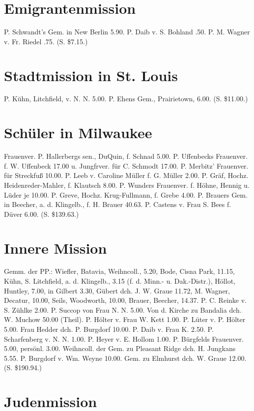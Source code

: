 \section{Emigrantenmission}

P. Schwandt’s Gem. in New Berlin 5.90. P. Daib v. S. Bohland .50. P. M. Wagner v. Fr. Riedel .75. (S. \$7.15.)

\section{Stadtmission in St. Louis}

P. Kühn, Litchfield, v. N. N. 5.00. P. Ehens Gem., Prairietown, 6.00. (S. \$11.00.)

\section{Schüler in Milwaukee}

Frauenver. P. Hallerbergs sen., DuQuin, f. Schnad 5.00. P. Uffenbecks Frauenver. f. W. Uffenbeck 17.00 u. Jungfrver. für C. Schmodt 17.00. P. Merbitz’ Frauenver. für Streckfuß 10.00. P. Leeb v. Caroline Müller f. G. Müller 2.00. P. Gräf, Hochz. Heidenreder-Mahler, f. Klautsch 8.00. P. Wunders Frauenver. f. Höhne, Hennig u. Lüder je 10.00. P. Greve, Hochz. Krug-Fullmann, f. Grebe 4.00. P. Brauers Gem. in Beecher, a. d. Klingelb., f. H. Brauer 40.63. P. Castens v. Frau S. Bees f. Düver 6.00. (S. \$139.63.)

\section{Innere Mission}

Gemm. der PP.: Wiefler, Batavia, Weihncoll., 5.20, Bode, Cisna Park, 11.15, Kühn, S. Litchfield, a. d. Klingelb., 3.15 (f. d. Minn.- u. Dak.-Distr.), Höllot, Huntley, 7.00, in Gilbert 3.30, Gübert dch. J. W. Graue 11.72, M. Wagner, Decatur, 10.00, Seils, Woodworth, 10.00, Brauer, Beecher, 14.37. P. C. Reinke v. S. Zühlke 2.00. P. Succop von Frau N. N. 5.00. Von d. Kirche zu Bandalia dch. W. Muchow 50.00 (Theil). P. Hölter v. Frau W. Kett 1.00. P. Lüter v. P. Hölter 5.00. Frau Hedder dch. P. Burgdorf 10.00. P. Daib v. Frau K. 2.50. P. Scharfenberg v. N. N. 1.00. P. Heyer v. E. Hollom 1.00. P. Bürgfelds Frauenver. 5.00, persönl. 3.00. Weihncoll. der Gem. zu Pleasant Ridge dch. H. Jungkans 5.55. P. Burgdorf v. Wm. Weyne 10.00. Gem. zu Elmhurst dch. W. Graue 12.00. (S. \$190.94.)

\section{Judenmission}

